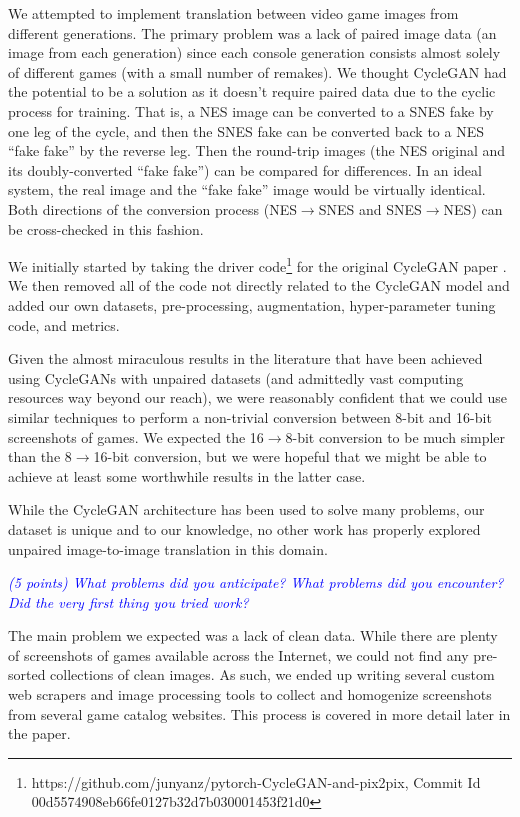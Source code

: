 \documentclass[10pt,twocolumn,letterpaper]{article}
\begin{document}
We attempted to implement translation between video game images from different generations. The primary problem was a lack of paired image data (an image from each generation) since each console generation consists almost solely of different games (with a small number of remakes). We thought CycleGAN had the potential to be a solution as it doesn't require paired data due to the cyclic process for training. That is, a NES image can be converted to a SNES fake by one leg of the cycle, and then the SNES fake can be converted back to a NES ``fake fake'' by the reverse leg. Then the round-trip images (the NES original and its doubly-converted ``fake fake'') can be compared for differences. In an ideal system, the real image and the ``fake fake'' image would be virtually identical. Both directions of the conversion process (NES$\rightarrow$SNES and SNES$\rightarrow$NES) can be cross-checked in this fashion.

We initially started by taking the driver code\footnote{https://github.com/junyanz/pytorch-CycleGAN-and-pix2pix, Commit Id 00d5574908eb66fe0127b32d7b030001453f21d0} for the original CycleGAN paper \cite{CycleGAN}. We then removed all of the code not directly related to the CycleGAN model and added our own datasets, pre-processing, augmentation, hyper-parameter tuning code, and metrics.

Given the almost miraculous results in the literature that have been achieved using CycleGANs with unpaired datasets (and admittedly vast computing resources way beyond our reach), we were reasonably confident that we could use similar techniques to perform a non-trivial conversion between 8-bit and 16-bit screenshots of games. We expected the 16$\rightarrow$8-bit conversion to be much simpler than the 8$\rightarrow$16-bit conversion, but we were hopeful that we might be able to achieve at least some worthwhile results in the latter case.

While the CycleGAN architecture has been used to solve many problems, our dataset is unique and to our knowledge, no other work has properly explored unpaired image-to-image translation in this domain.

\textit{\textcolor{blue}{(5 points) What problems did you anticipate? What problems did you encounter? Did the very first thing you tried work?}}

The main problem we expected was a lack of clean data. While there are plenty of screenshots of games available across the Internet, we could not find any pre-sorted collections of clean images. As such, we ended up writing several custom web scrapers and image processing tools to collect and homogenize screenshots from several game catalog websites. This process is covered in more detail later in the paper.
\end{document}
